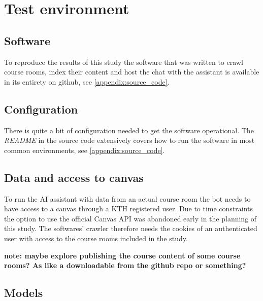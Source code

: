\section{Test environment}




\subsection{Software}


To reproduce the results of this study the software that was written to crawl course rooms, index their content and host the chat with the assistant is available in its entirety on github, see \autoref{appendix:source_code}.


\subsection{Configuration}


There is quite a bit of configuration needed to get the software operational. The \textit{README} in the source code extensively covers how to run the software in most common environments, see \autoref{appendix:source_code}.


\subsection[Data/Access to Canvas]{Data and access to canvas}


To run the AI assistant with data from an actual course room the bot needs to have access to a canvas through a KTH registered user. Due to time constraints the option to use the official Canvas API was abandoned early in the planning of this study. The softwares’ crawler therefore needs the cookies of an authenticated user with access to the course rooms included in the study.


\textbf{note: maybe explore publishing the course content of some course rooms? As like a downloadable from the github repo or something?}


\subsection{Models}


